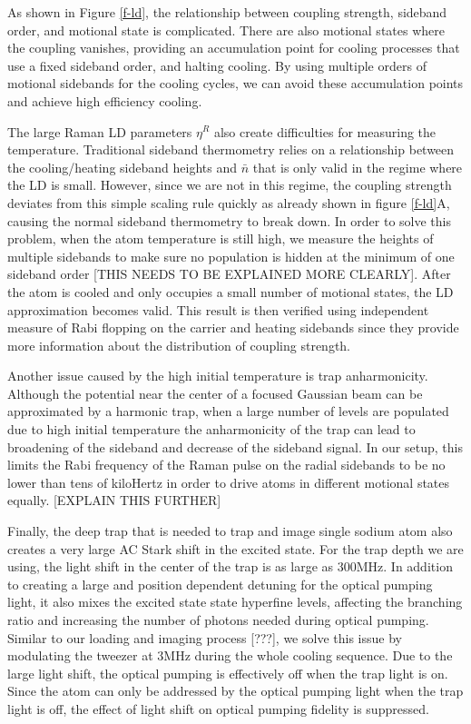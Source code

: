 \documentclass[aps,prl,twocolumn,groupedaddress]{revtex4-1}
\begin{document}
As shown in Figure \ref{f-ld}, the relationship between coupling strength, sideband order, and motional state is complicated.  There are also motional states where the coupling vanishes, providing an accumulation point for cooling processes that use a fixed sideband order, and halting cooling.  By using multiple orders of motional sidebands for the cooling cycles, we can avoid these accumulation points and achieve high efficiency cooling.

The large Raman LD parameters $\eta^R$
also create difficulties for measuring the temperature. Traditional sideband thermometry relies on
a relationship between the cooling/heating sideband heights and $\bar n$ that is only valid in the regime where the LD is small. However, since we are not in this regime, the coupling strength deviates from this simple scaling rule quickly as already
shown in figure \ref{f-ld}A, causing the normal sideband thermometry to break down.
In order to solve this problem, when the atom temperature is still high,
we measure the heights of multiple sidebands to make sure no population is hidden at the
minimum of one sideband order [THIS NEEDS TO BE EXPLAINED MORE CLEARLY]. After the atom is cooled and only occupies a small number of motional states, the LD approximation becomes valid.
This result is then verified using independent measure of Rabi flopping on the carrier and heating
sidebands since they provide more information about the distribution of coupling strength.

Another issue caused by the high initial temperature is trap anharmonicity.
Although the potential near the center of a focused Gaussian beam can be approximated
by a harmonic trap, when a large number of levels are populated due to high initial temperature
the anharmonicity of the trap can lead to broadening of the sideband and decrease of
the sideband signal. In our setup, this limits the Rabi frequency of the Raman pulse
on the radial sidebands to be no lower than tens of kiloHertz in order to drive atoms in
different motional states equally. [EXPLAIN THIS FURTHER]

Finally, the deep trap that is needed to trap and image single sodium atom also creates
a very large AC Stark shift in the excited state. For the trap depth we are using, the
light shift in the center of the trap is as large as $300\text{MHz}$.
In addition to creating a large and position dependent detuning for the optical pumping light,
it also mixes the excited state state hyperfine levels,
affecting the branching ratio and increasing the number of photons needed during optical pumping.
Similar to our loading and imaging process [???], we solve this issue by modulating the
tweezer at $3\text{MHz}$ during the whole cooling sequence.
Due to the large light shift, the optical pumping is effectively off when the trap light is on.
Since the atom can only be addressed by the optical pumping light when the trap light is off,
the effect of light shift on optical pumping fidelity is suppressed.
\end{document}
